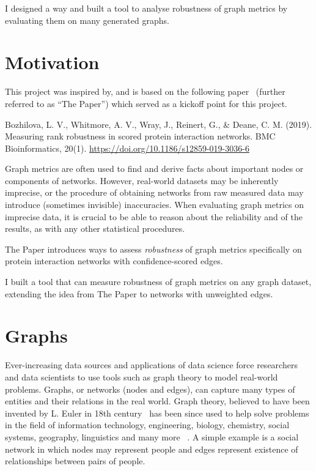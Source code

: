 I designed a way and built a tool to analyse robustness of graph metrics by evaluating them on many generated graphs.

\section{Motivation}

This project was inspired by, and is based on the following paper~\cite{Bozhilova2019} (further referred to as ``The Paper'') which served as a kickoff point for this project.
\begin{adjustwidth}{1cm}{}
    \vspace*{0.5em}
    Bozhilova, L. V., Whitmore, A. V., Wray, J., Reinert, G., \& Deane, C. M. (2019). Measuring rank robustness in scored protein interaction networks. BMC Bioinformatics, 20(1). \url{https://doi.org/10.1186/s12859-019-3036-6}
    \vspace*{0.5em}
\end{adjustwidth}

Graph metrics are often used to find and derive facts about important nodes or components of networks.
However, real-world datasets may be inherently imprecise, or the procedure of obtaining networks from raw measured data may introduce (sometimes invisible) inaccuracies.
When evaluating graph metrics on imprecise data, it is crucial to be able to reason about the reliability and of the results, as with any other statistical procedures.

The Paper introduces ways to assess \textsl{robustness} of graph metrics specifically on protein interaction networks with confidence-scored edges.

I built a tool that can measure robustness of graph metrics on any graph dataset, extending the idea from The Paper to networks with unweighted edges.

\section{Graphs}

Ever-increasing data sources and applications of data science force researchers and data scientists to use tools such as graph theory to model real-world problems.
Graphs, or networks (nodes and edges), can capture many types of entities and their relations in the real world.
Graph theory, believed to have been invented by L. Euler in 18th century~\cite{BiggsGraphTheory173619361986} has been since used to help solve problems in the field of information technology, engineering, biology, chemistry, social systems, geography, linguistics and many more ~\cite{FouldsGraphTheoryApplications2012}.
A simple example is a social network in which nodes may represent people and edges represent existence of relationships between pairs of people.


